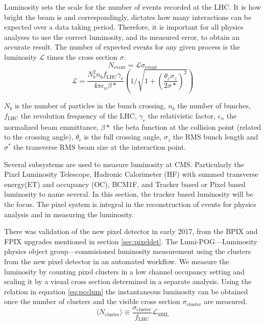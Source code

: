 Luminosity sets the scale for the number of events recorded at the LHC. It is how bright the beam is and correspondingly, dictates how many interactions can be expected over a data taking period. Therefore, it is important for all physics analyses to use the correct luminosity, and its measured error, to obtain an accurate result. The number of expected events for any given process is the luminosity $\mathcal{L}$ times the cross section $\sigma$.  
\begin{equation}
N_{\text{event}} = \mathcal{L} \sigma_{\text{event}}
\end{equation}
\begin{equation}
\mathcal{L} = \frac{N_b^2 n_b f_\text{LHC} \gamma_r}{4\pi\epsilon_n \beta*}\left( 1 / \sqrt{1+ (\frac{\theta_c \sigma_z}{2\sigma*})^2} \right)
\end{equation}

$N_b$ is the number of particles in the bunch crossing, $n_b$ the number of bunches, $f_{\text{LHC}}$ the revolution frequency of the LHC, $\gamma_r$ the relativistic factor, $\epsilon_n$ the normalized beam emmittance, $\beta*$ the beta function at the collision point (related to the crossing angle), $\theta_c$ is the full crossing angle, $\sigma_z$ the RMS bunch length and $\sigma^*$ the transverse RMS beam size at the interaction point.

Several subsystems are used to measure luminosity at CMS. Particularly the Pixel Luminosity Telescope, Hadronic Calorimeter (HF) with summed transverse energy(ET) and occupancy (OC), BCM1F, and Tracker based or Pixel based luminosity to name several. 
In this section, the tracker based luminosity will be the focus. The pixel system is integral in the reconstruction of events for physics analysis and in measuring the luminosity.

There was validation of the new pixel detector in early 2017, from the BPIX and FPIX upgrades mentioned in section \ref{sec:pixeldet}. The Lumi-POG---Luminosity physics object group---commisioned luminosity measurement using the clusters from the new pixel detector in an automated workflow. 
We measure the luminosity by counting pixel clusters in a low channel occupancy setting and scaling it by a visual cross section determined in a separate analysis. Using the relation in equation \ref{eq:pcclum} the instantaneous luminosity can be obtained once the number of clusters and the visible cross section $\sigma_\text{cluster}$ are measured. 
\begin{equation}
\label{eq:pcclum}
\langle N_{\text{cluster}}\rangle\equiv\frac{\sigma_{\text{cluster}}}{f_{\text{LHC}}}\mathcal{L}_{\text{SBIL}}
\end{equation}

